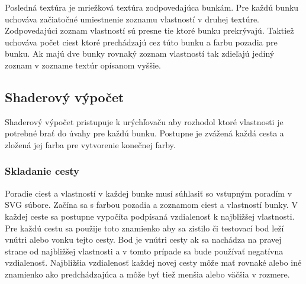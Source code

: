 Posledná textúra je mriežková textúra zodpovedajúca bunkám. Pre každú bunku uchováva začiatočné umiestnenie zoznamu vlastností v druhej textúre. Zodpovedajúci zoznam vlastností sú presne tie ktoré bunku prekrývajú. Taktiež uchováva počet ciest ktoré prechádzajú cez túto bunku a farbu pozadia pre bunku. Ak majú dve bunky rovnaký zoznam vlastností tak zdieľajú jediný zoznam v zozname textúr opísanom vyššie.

\subsection{Shaderový výpočet}

Shaderový výpočet pristupuje k urýchľovaču aby rozhodol ktoré vlastnosti je potrebné brať do úvahy pre každú bunku. Postupne je zvážená každá cesta a zložená jej farba pre vytvorenie konečnej farby.

\subsubsection{Skladanie cesty}

Poradie ciest a vlastností v každej bunke musí súhlasiť so vstupným poradím v SVG súbore. Začína sa s farbou pozadia a zoznamom ciest a vlastností bunky. V každej ceste sa postupne vypočíta podpísaná vzdialenosť k najbližšej vlastnosti. Pre každú cestu sa použije toto znamienko aby sa zistilo či testovací bod leží vnútri alebo vonku tejto cesty. Bod je vnútri cesty ak sa nachádza na pravej strane od najbližšej vlastnosti a v tomto prípade sa bude používať negatívna vzdialenosť. Najbližšia vzdialenosť každej novej cesty môže mať rovnaké alebo iné znamienko ako predchádzajúca a môže byť tiež menšia alebo väčšia v rozmere.

